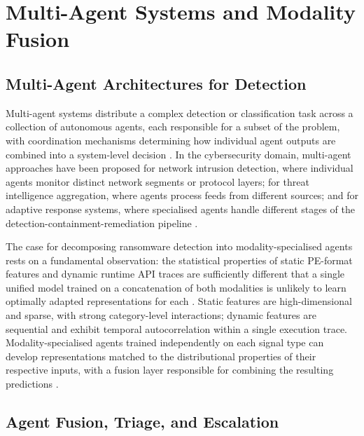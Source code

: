 \section{Multi-Agent Systems and Modality Fusion}
\label{sec:lit_mas}

\subsection{Multi-Agent Architectures for Detection}
\label{sec:lit_mas_arch}

Multi-agent systems distribute a complex detection or classification task across a collection
of autonomous agents, each responsible for a subset of the problem, with coordination
mechanisms determining how individual agent outputs are combined into a system-level
decision \cite{MultiAgentAdaptiveDetection2023}.
In the cybersecurity domain, multi-agent approaches have been proposed for network intrusion
detection, where individual agents monitor distinct network segments or protocol layers; for
threat intelligence aggregation, where agents process feeds from different sources; and for
adaptive response systems, where specialised agents handle different stages of the
detection-containment-remediation pipeline \cite{MultiAgentAdaptiveDetection2023,
AIenhancedDefense2022}.

The case for decomposing ransomware detection into modality-specialised agents rests on a
fundamental observation: the statistical properties of static PE-format features and dynamic
runtime API traces are sufficiently different that a single unified model trained on a
concatenation of both modalities is unlikely to learn optimally adapted representations for
each \cite{Ferdous2024Comp}.
Static features are high-dimensional and sparse, with strong category-level interactions;
dynamic features are sequential and exhibit temporal autocorrelation within a single execution
trace.
Modality-specialised agents trained independently on each signal type can develop
representations matched to the distributional properties of their respective inputs, with a
fusion layer responsible for combining the resulting predictions \cite{MultiAgentAdaptiveDetection2023}.

\subsection{Agent Fusion, Triage, and Escalation}
\label{sec:lit_fusion}

